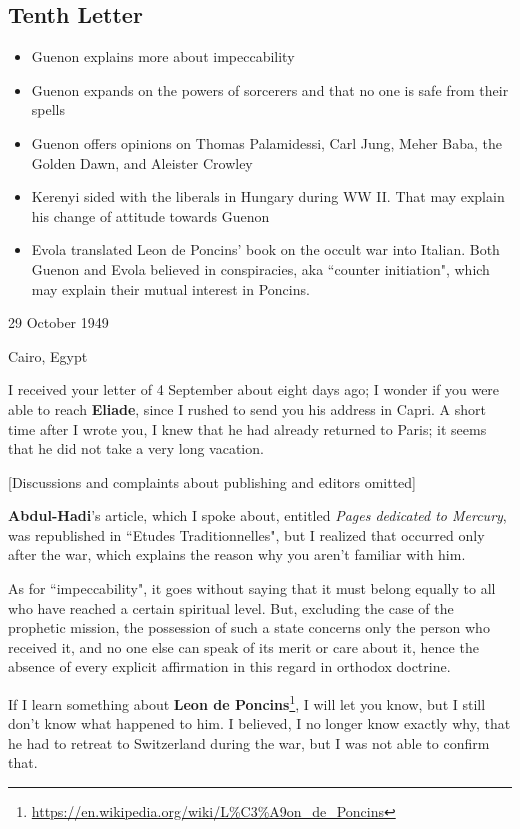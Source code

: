 \subsection{Tenth Letter}

\begin{quotex}
\begin{itemize}
\item
Guenon explains more about impeccability 
\item
Guenon expands on the powers of sorcerers and that no one is safe from their spells 
\item
Guenon offers opinions on Thomas Palamidessi, Carl Jung, Meher Baba, the Golden Dawn, and Aleister Crowley 
\item
Kerenyi sided with the liberals in Hungary during WW II. That may explain his change of attitude towards Guenon 
\item
Evola translated Leon de Poncins' book on the occult war into Italian. Both Guenon and Evola believed in conspiracies, aka ``counter initiation", which may explain their mutual interest in Poncins. 
\end{itemize}
\end{quotex}

29 October 1949

Cairo, Egypt

I received your letter of 4 September about eight days ago; I wonder if you were able to reach \textbf{Eliade}, since I rushed to send you his address in Capri. A short time after I wrote you, I knew that he had already returned to Paris; it seems that he did not take a very long vacation.

[Discussions and complaints about publishing and editors omitted]

\textbf{Abdul-Hadi}'s article, which I spoke about, entitled \emph{Pages dedicated to Mercury}, was republished in ``Etudes Traditionnelles", but I realized that occurred only after the war, which explains the reason why you aren't familiar with him.

As for ``impeccability", it goes without saying that it must belong equally to all who have reached a certain spiritual level. But, excluding the case of the prophetic mission, the possession of such a state concerns only the person who received it, and no one else can speak of its merit or care about it, hence the absence of every explicit affirmation in this regard in orthodox doctrine.

If I learn something about \textbf{Leon de Poncins}\footnote{\url{https://en.wikipedia.org/wiki/L\%C3\%A9on_de_Poncins}}, I will let you know, but I still don't know what happened to him. I believed, I no longer know exactly why, that he had to retreat to Switzerland during the war, but I was not able to confirm that.

